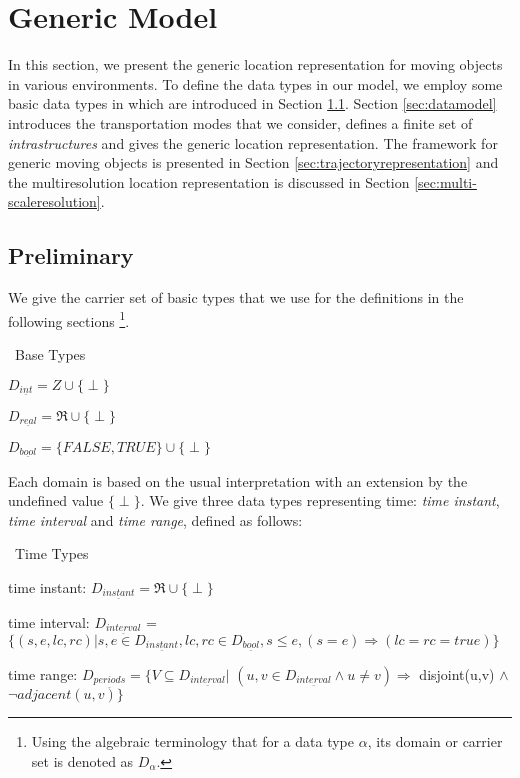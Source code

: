 \section{Generic Model}
\label{sec:genericmodel}
In this section, we present the generic location representation for moving objects in various environments. To define the data types in our model, we employ some basic data types in \cite{FG+00}
which are introduced in Section \ref{sec:preliminary}. Section \ref{sec:datamodel} introduces the transportation modes that we consider, defines a finite set of \textit{intrastructures} and gives the generic location representation. The framework for generic moving objects is presented in Section \ref{sec:trajectoryrepresentation} and the multiresolution location representation is discussed in Section \ref{sec:multi-scaleresolution}.

\subsection{Preliminary}
\label{sec:preliminary}
We give the carrier set of basic types that we use for the definitions in the following sections 
\footnote{Using the algebraic terminology 
that for a data type $\alpha$, its domain or carrier set is denoted as $D_{\alpha}$.}. 

\begin{Statement}
\label{basictype}
\ Base Types 

$D_{\underline{int}} = Z \cup \{\perp\}$

$D_{\underline{real}} = \Re \cup \{\perp\}$

$D_{\underline{bool}} = \{FALSE,TRUE\} \cup \{\perp\}$

\end{Statement}

Each domain is based on the usual interpretation with an extension by the undefined value $\{\perp\}$. 
We give three data types representing time: \textit{time instant}, \textit{time interval} and \textit{time range}, defined as follows: 

\begin{Statement}
\label{timetype}
\ Time Types  

time instant: $D_{\underline{instant}} = \Re \cup \{\perp\}$

time interval: $D_{\underline{interval}}$ = $\{(s,e,lc,rc)|s,e \in D_{\underline{instant}}, lc, rc \in D_{\underline{bool}}, s\leq e, (s=e) \Rightarrow (lc=rc=true)\}$

time range: $D_{\underline{periods}}=\{V \subseteq D_{\underline{interval}}|$
$(u,v \in D_{\underline{interval}} \wedge u\neq v)\Rightarrow$ disjoint(u,v) $\wedge$ $\neg adjacent(u,v) \}$
\end{Statement}

